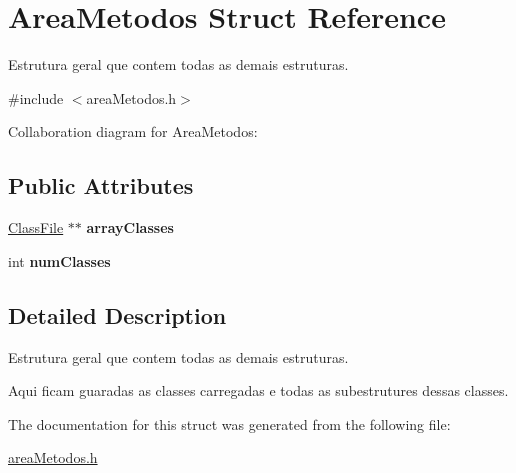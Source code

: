 \hypertarget{structAreaMetodos}{}\section{Area\+Metodos Struct Reference}
\label{structAreaMetodos}


Estrutura geral que contem todas as demais estruturas.  




{\ttfamily \#include $<$area\+Metodos.\+h$>$}



Collaboration diagram for Area\+Metodos\+:
\subsection*{Public Attributes}
\begin{DoxyCompactItemize}
\item 
\mbox{\label{structAreaMetodos_a2f53ae03ffa9b13b9866efb46811c988}} 
\hyperlink{structClassFile}{Class\+File} $\ast$$\ast$ {\bfseries array\+Classes}
\item 
\mbox{\label{structAreaMetodos_a16f79347136c9dda54c97a62bd596887}} 
int {\bfseries num\+Classes}
\end{DoxyCompactItemize}


\subsection{Detailed Description}
Estrutura geral que contem todas as demais estruturas. 

Aqui ficam guaradas as classes carregadas e todas as subestrutures dessas classes. 

The documentation for this struct was generated from the following file\+:\begin{DoxyCompactItemize}
\item 
\hyperlink{areaMetodos_8h}{area\+Metodos.\+h}\end{DoxyCompactItemize}
